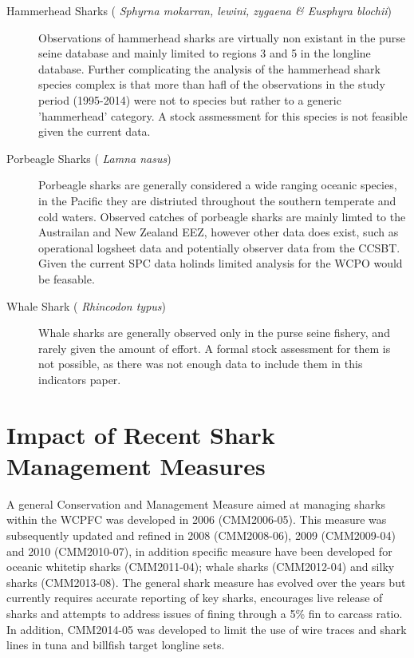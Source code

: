 \documentclass[12pt]{SCreport}
\begin{document}
\begin{description}
\item[ Hammerhead Sharks (\emph{ Sphyrna mokarran, lewini, zygaena \& Eusphyra blochii}) ]  Observations of hammerhead sharks are virtually non existant in the purse seine database and mainly limited to  regions 3 and 5 in the longline database.  Further complicating the analysis of the hammerhead shark species complex is  that more than hafl of the observations in the study period (1995-2014) were not to species but rather to a generic 'hammerhead' category. A stock assmessment for this species is not feasible given the current data.


\item[ Porbeagle Sharks (\emph{ Lamna nasus}) ] Porbeagle sharks are generally considered a wide ranging oceanic species, in the Pacific they are distriuted throughout the southern temperate and cold waters.  Observed catches of porbeagle sharks are mainly limted to the Austrailan and New Zealand EEZ, however other data does exist, such as operational logsheet data and  potentially observer data from the CCSBT.  Given the current SPC data holinds limited analysis for the WCPO would be feasable.

\item[ Whale Shark (\emph{ Rhincodon typus}) ] Whale sharks are generally observed only in the purse seine fishery, and rarely given the amount of effort.  A formal stock assessment for them is not possible, as there was not enough data to include them in this indicators paper. 

\end{description}

\section{Impact of Recent Shark Management Measures}

A general Conservation and Management Measure aimed at managing sharks within the WCPFC was developed in 2006 (CMM2006-05). This measure was subsequently updated and refined in 2008 (CMM2008-06), 2009 (CMM2009-04) and 2010 (CMM2010-07), in addition specific measure have been developed for oceanic whitetip sharks (CMM2011-04); whale sharks (CMM2012-04) and silky sharks (CMM2013-08). The general shark measure has evolved over the years but currently requires accurate reporting of key sharks, encourages live release of sharks and attempts to address issues of fining through a 5\% fin to carcass ratio. In addition, CMM2014-05 was developed to limit the use of wire traces and shark lines in tuna and billfish target longline sets. 
\end{document}
